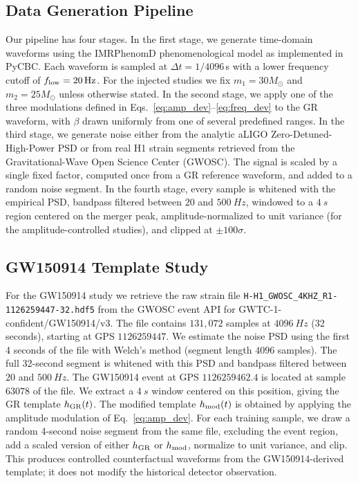 \subsection{Data Generation Pipeline}

Our pipeline has four stages. In the first stage, we generate
time-domain waveforms using the IMRPhenomD phenomenological model
\citep{Khan2016} as implemented in PyCBC. Each waveform is sampled at
$\Delta t = 1/4096$\,s with a lower frequency cutoff of
$f_{\rm low} = \SI{20}{Hz}$. For the injected studies we fix
$m_1 = 30 M_\odot$ and $m_2 = 25 M_\odot$ unless otherwise stated. In
the second stage, we apply one of the three modulations defined in
Eqs.~\eqref{eq:amp_dev}--\eqref{eq:freq_dev} to the GR waveform, with
$\beta$ drawn uniformly from one of several predefined ranges. In the
third stage, we generate noise either from the analytic aLIGO
Zero-Detuned-High-Power PSD \citep{psd_model} or from real H1 strain
segments retrieved from the Gravitational-Wave Open Science Center
(GWOSC). The signal is scaled by a single fixed factor, computed once
from a GR reference waveform, and added to a random noise segment. In
the fourth stage, every sample is whitened with the empirical PSD,
bandpass filtered between $20$ and $\SI{500}{Hz}$, windowed to a
$\SI{4}{s}$ region centered on the merger peak, amplitude-normalized
to unit variance (for the amplitude-controlled studies), and clipped
at $\pm 100\sigma$.

\subsection{GW150914 Template Study}

For the GW150914 study we retrieve the raw strain file
\texttt{H-H1\_GWOSC\_4KHZ\_R1-1126259447-32.hdf5} from the GWOSC
event API for GWTC-1-confident/GW150914/v3. The file contains
$131{,}072$ samples at $\SI{4096}{Hz}$ (32 seconds), starting at
GPS $1126259447$. We estimate the noise PSD using the first 4 seconds
of the file with Welch's method (segment length $4096$ samples). The
full 32-second segment is whitened with this PSD and bandpass filtered
between $20$ and $\SI{500}{Hz}$. The GW150914 event at GPS
$1126259462.4$ is located at sample $63078$ of the file. We extract a
$\SI{4}{s}$ window centered on this position, giving the GR template
$h_{\rm GR}(t)$. The modified template $h_{\rm mod}(t)$ is obtained
by applying the amplitude modulation of Eq.~\eqref{eq:amp_dev}. For
each training sample, we draw a random 4-second noise segment from
the same file, excluding the event region, add a scaled version of
either $h_{\rm GR}$ or $h_{\rm mod}$, normalize to unit variance, and
clip. This produces controlled counterfactual waveforms from the
GW150914-derived template; it does not modify the historical detector
observation.

